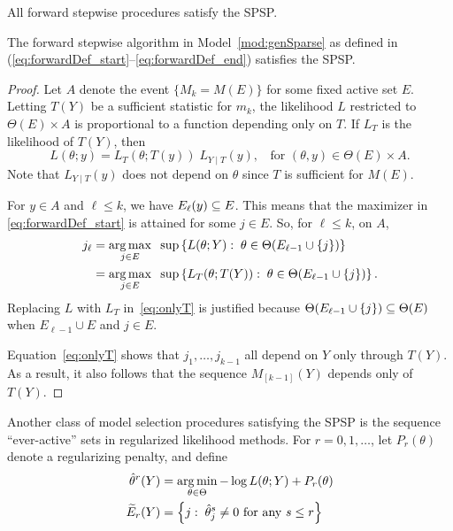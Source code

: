 \documentclass{article}
\begin{document}
\begin{example}
\end{example}

All forward stepwise procedures satisfy the SPSP.

\begin{proposition}\label{prop:forwardSPSP}
  The forward stepwise algorithm in Model~\ref{mod:genSparse} as defined in (\ref{eq:forwardDef_start}--\ref{eq:forwardDef_end}) satisfies the SPSP.
\end{proposition}
\begin{proof}
  Let $A$ denote the event $\{M_k = M(E)\}$ for some fixed active set $E$. Letting $T(Y)$ be a sufficient statistic for $m_k$, the likelihood $L$ restricted to $\Theta(E) \times A$ is proportional to a function depending only on $T$. If $L_T$ is the likelihood of $T(Y)$, then
\[
L(\theta; y) = L_T(\theta; T(y)) \;L_{Y\mid T}(y), \;\; \text{ for } (\theta, y) \in  \Theta(E) \times A.
\]
Note that $L_{Y \mid T}(y)$ does not depend on $\theta$ since $T$ is sufficient for $M(E)$.

For $y\in A$ and $\ell \leq k$, we have $E_\ell(y) \subseteq E$. This means that the maximizer in \eqref{eq:forwardDef_start} is attained for some $j\in E$. So, for $\ell \leq k$, on $A$,
\begin{align}
  j_\ell &= \operatorname*{arg\,max}_{j\in E} \;\;\sup \left\{L(\theta; Y):\;
    \theta\in\Theta(E_{\ell-1} \cup \{j\})\right\} \\
  &= \operatorname*{arg\,max}_{j\in E} \;\;\sup \left\{L_T(\theta; T(Y)):\;
    \theta\in\Theta(E_{\ell-1} \cup \{j\})\right\}. \label{eq:onlyT}
\end{align}
Replacing $L$ with $L_T$ in~\eqref{eq:onlyT} is justified because $\Theta(E_{\ell - 1} \cup \{j\}) \subseteq \Theta(E)$ when $E_{\ell-1}\cup E$ and $j\in E$.

Equation~\eqref{eq:onlyT} shows that $j_1,\ldots, j_{k-1}$ all depend on $Y$ only through $T(Y)$. As a result, it also follows that the sequence $M_{[k-1]}(Y)$ depends only of $T(Y)$.
\end{proof}

Another class of model selection procedures satisfying the SPSP is the sequence ``ever-active'' sets in regularized likelihood methods. For $r=0,1,\ldots$, let $P_r(\theta)$ denote a regularizing penalty, and define
\begin{align}\label{eq:regPathDef_start}
  \hat\theta^{r}(Y) &= 
  \operatorname*{arg\,min}_{\theta\in\Theta} -\log L(\theta; Y) + P_r(\theta) \\
  \widetilde{E}_r(Y) &= \left\{j:\; \hat\theta_j^s \neq 0 
    \text{ for any } s \leq r \right\}
\end{align}
\end{document}
